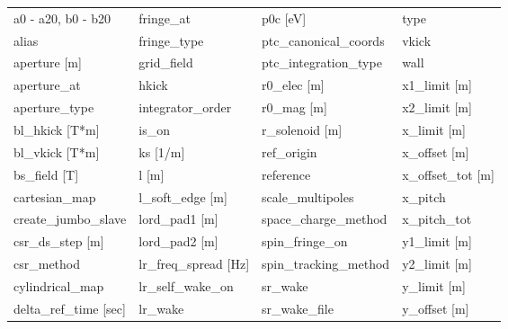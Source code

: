  \begin{tabular}{llll} \toprule
a0 - a20, b0 - b20               & fringe_at                        & p0c [eV]                         & type                             \\
alias                            & fringe_type                      & ptc_canonical_coords             & vkick                            \\
aperture [m]                     & grid_field                       & ptc_integration_type             & wall                             \\
aperture_at                      & hkick                            & r0_elec [m]                      & x1_limit [m]                     \\
aperture_type                    & integrator_order                 & r0_mag [m]                       & x2_limit [m]                     \\
bl_hkick [T*m]                   & is_on                            & r_solenoid [m]                   & x_limit [m]                      \\
bl_vkick [T*m]                   & ks [1/m]                         & ref_origin                       & x_offset [m]                     \\
bs_field [T]                     & l [m]                            & reference                        & x_offset_tot [m]                 \\
cartesian_map                    & l_soft_edge [m]                  & scale_multipoles                 & x_pitch                          \\
create_jumbo_slave               & lord_pad1 [m]                    & space_charge_method              & x_pitch_tot                      \\
csr_ds_step [m]                  & lord_pad2 [m]                    & spin_fringe_on                   & y1_limit [m]                     \\
csr_method                       & lr_freq_spread [Hz]              & spin_tracking_method             & y2_limit [m]                     \\
cylindrical_map                  & lr_self_wake_on                  & sr_wake                          & y_limit [m]                      \\
delta_ref_time [sec]             & lr_wake                          & sr_wake_file                     & y_offset [m]                     \\

\end{tabular}
